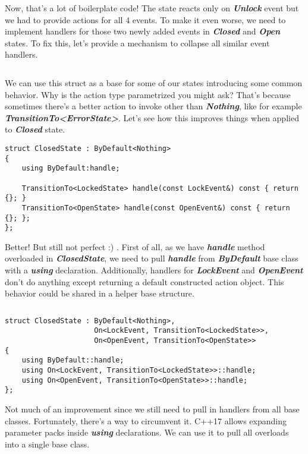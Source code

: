 \documentclass{article}[8pt]
\newcommand{\code}[1]{\textbf{\textit{#1}}}
\newcommand{\closed}{\code{Closed}}
\newcommand{\open}{\code{Open}}
\newcommand{\unlock}{\code{Unlock}}
\begin{document}
Now, that's a lot of boilerplate code! The state reacts only on \unlock{} event but we had to provide actions for all 4 events. To make it even worse, we need to implement handlers for those two newly added events in \closed{} and \open{} states. To fix this, let's provide a mechanism to collapse all similar event handlers.

\bigskip
\inputminted[firstline=3]{c++}{../fsm/actions/ByDefault.h}
\bigskip

We can use this struct as a base for some of our states introducing some common behavior. Why is the action type parametrized you might ask? That's because sometimes there's a better action to invoke other than \code{Nothing}, like for example
\\\code{TransitionTo<ErrorState>}. Let's see how this improves things when applied to \closed{} state.

\bigskip
\begin{verbatim}
struct ClosedState : ByDefault<Nothing>
{
    using ByDefault:handle;

    TransitionTo<LockedState> handle(const LockEvent&) const { return {}; }
    TransitionTo<OpenState> handle(const OpenEvent&) const { return {}; };
};
\end{verbatim}
\bigskip

Better! But still not perfect :) . First of all, as we have \code{handle} method overloaded in \code{ClosedState}, we need to pull \code{handle} from \code{ByDefault} base class with a \code{using} declaration.
Additionally, handlers for \code{LockEvent} and \code{OpenEvent} don't do anything except returning a default constructed action object. This behavior could be shared in a helper base structure.

\bigskip
\inputminted[firstline=3]{c++}{../fsm/actions/On.h}
\bigskip
\begin{verbatim}
struct ClosedState : ByDefault<Nothing>,
                     On<LockEvent, TransitionTo<LockedState>>,
                     On<OpenEvent, TransitionTo<OpenState>>
{
    using ByDefault::handle;
    using On<LockEvent, TransitionTo<LockedState>>::handle;
    using On<OpenEvent, TransitionTo<OpenState>>::handle;
};
\end{verbatim}
\bigskip

Not much of an improvement since we still need to pull in handlers from all base classes. Fortunately, there's a way to circumvent it. C++17 allows expanding parameter packs inside \code{using} declarations. We can use it to pull all overloads into a single base class.
\end{document}
